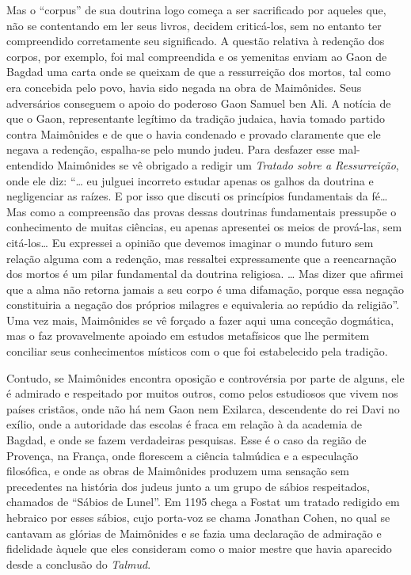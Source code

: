 Mas o ``corpus'' de sua doutrina logo começa a ser sacrificado por
aqueles que, não se contentando em ler seus livros, decidem criticá-los,
sem no entanto ter compreendido corretamente seu significado. A questão
relativa à redenção dos corpos, por exemplo, foi mal compreendida e os
yemenitas enviam ao Gaon de Bagdad uma carta onde se queixam de que a
ressurreição dos mortos, tal como era concebida pelo povo, havia sido
negada na obra de Maimônides. Seus adversários conseguem o apoio do poderoso Gaon Samuel
ben Ali. A notícia de que o Gaon, representante legítimo da tradição
judaica, havia tomado partido contra Maimônides e de que o havia
condenado e provado claramente que ele negava a redenção, espalha-se
pelo mundo judeu. Para desfazer esse mal-entendido Maimônides se vê
obrigado a redigir um \emph{Tratado sobre a Ressurreição}, onde ele diz:
``\ldots{} eu julguei incorreto estudar apenas os galhos da doutrina e
negligenciar as raízes. E por isso que discuti os princípios
fundamentais da fé\ldots{} Mas como a compreensão das provas dessas
doutrinas fundamentais pressupõe o conhecimento de muitas ciências, eu
apenas apresentei os meios de prová-las, sem citá-los\ldots{} Eu expressei a
opinião que devemos imaginar o mundo futuro sem relação alguma com a
redenção, mas ressaltei expressamente que a reencarnação dos mortos é
um pilar fundamental da doutrina religiosa. \ldots{} Mas dizer que afirmei
que a alma não retorna jamais a seu corpo é uma difamação, porque essa
negação constituiria a negação dos próprios milagres e equivaleria ao
repúdio da religião''. Uma vez mais, Maimônides se vê forçado a fazer
aqui uma conceção dogmática, mas o faz provavelmente apoiado em estudos
metafísicos que lhe permitem conciliar seus conhecimentos místicos com
o que foi estabelecido pela tradição.

Contudo, se Maimônides encontra oposição e controvérsia por parte de
alguns, ele é admirado e respeitado por muitos outros, como pelos
estudiosos que vivem nos países cristãos, onde não há nem Gaon nem
Exilarca, descendente do rei Davi no exílio, onde a autoridade das
escolas é fraca em relação à da academia de Bagdad, e onde se fazem
verdadeiras pesquisas. Esse é o caso da região de Provença, na França,
onde florescem a ciência talmúdica e a especulação filosófica, e onde as
obras de Maimônides produzem uma sensação sem precedentes na história
dos judeus junto a um grupo de sábios respeitados, chamados de ``Sábios
de Lunel''. Em 1195 chega a Fostat um tratado redigido em hebraico por
esses sábios, cujo porta-voz se chama Jonathan Cohen, no qual se
cantavam as glórias de Maimônides e se fazia uma declaração de admiração
e fidelidade àquele que eles consideram como o maior mestre que havia
aparecido desde a conclusão do \emph{Talmud}.

